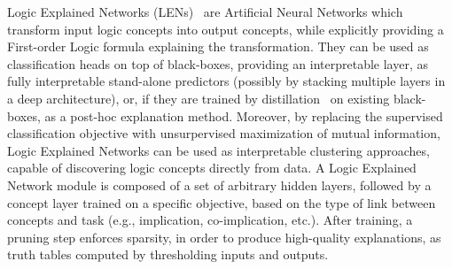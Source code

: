 Logic Explained Networks (LENs)~\cite{ciravegna2023logic} are Artificial Neural Networks which transform input logic concepts into output concepts, while explicitly providing a First-order Logic formula explaining the transformation. They can be used as classification heads on top of black-boxes, providing an interpretable layer, as fully interpretable stand-alone predictors (possibly by stacking multiple layers in a deep architecture), or, if they are trained by distillation~\cite{hinton2015distilling} on existing black-boxes, as a post-hoc explanation method. Moreover, by replacing the supervised classification objective with unsurpervised maximization of mutual information, Logic Explained Networks can be used as interpretable clustering approaches, capable of discovering logic concepts directly from data. 
A Logic Explained Network module is composed of a set of arbitrary hidden layers, followed by a concept layer trained on a specific objective, based on the type of link between concepts and task (e.g., implication, co-implication, etc.). %
After training, a pruning step enforces sparsity, in order to produce high-quality explanations, as truth tables computed by thresholding inputs and outputs.
\iffalse
$\psi$-networks have the best interpretability, but sacrifice both expressivity and explainability of black-box models, they impose a sigmoid activation to each of the hidden neurons and a node-level pruning of every weight below the top-k: these constraints guarantee disentanglement for each neuron and the dependence from at most k intermediate inputs.
$\mu$-networks, conversely, do not impose any architectural constraint on the hidden layers, but are pruned at the network-level, were the input concepts are globally weighted by importance and the least important ones are removed, this provides a reasonable compromise, by having decent expressivity and interpretability, and the maximum post-hoc explainability.
$ReLU$-networks have the highest expressivity and reasonable post-hoc explainability performance, at the expenses of low interpretability, they impose ReLU activations in the hidden layer and an example-level pruning which "shuts down" a different set of neurons for each input sample.
\fi
